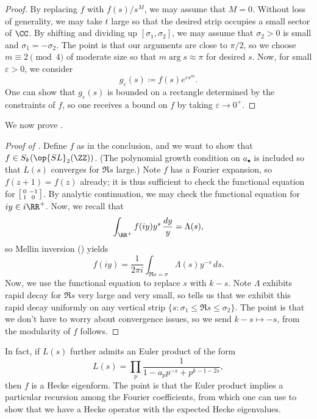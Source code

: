 \documentclass{article}
\begin{document}
\begin{proof}
	By replacing $f$ with $f(s)/s^M$, we may assume that $M=0$. Without loss of generality, we may take $t$ large so that the desired strip occupies a small sector of $\CC$. By shifting and dividing up $[\sigma_1,\sigma_2]$, we may assume that $\sigma_2>0$ is small and $\sigma_1=-\sigma_2$. The point is that our arguments are close to $\pi/2$, so we choose $m\equiv2\pmod4$ of moderate size so that $m\arg s\approx\pi$ for desired $s$. Now, for small $\varepsilon>0$, we consider
	\[g_\varepsilon(s)\coloneqq f(s)e^{\varepsilon s^m}.\]
	One can show that $g_\varepsilon(s)$ is bounded on a rectangle determined by the constraints of $f$, so one receives a bound on $f$ by taking $\varepsilon\to0^+$.
\end{proof}
We now prove .
\begin{proof}[Proof of ]
	Define $f$ as in the conclusion, and we want to show that $f\in S_k(\op{SL}_2(\ZZ))$. (The polynomial growth condition on $a_\bullet$ is included so that $L(s)$ converges for $\Re s$ large.) Note $f$ has a Fourier expansion, so $f(z+1)=f(z)$ already; it is thus sufficient to check the functional equation for $\begin{bsmallmatrix}
		0 & -1 \\ 1 & 0
	\end{bsmallmatrix}$. By analytic continuation, we may check the functional equation for $iy\in i\RR^+$. Now, we recall that
	\[\int_{\RR^+}f(iy)y^s\,\frac{dy}y=\Lambda(s),\]
	so Mellin inversion () yields
	\[f(iy)=\frac1{2\pi i}\int_{\Re s=\sigma}\Lambda(s)y^{-s}\,ds.\]
	Now, we use the functional equation to replace $s$ with $k-s$. Note $\Lambda$ exhibits rapid decay for $\Re s$ very large and very small, so  tells us that we exhibit this rapid decay uniformly on any vertical strip $\{s:\sigma_1\le\Re s\le\sigma_2\}$. The point is that we don't have to worry about convergence issues, so we send $k-s\mapsto-s$, from the modularity of $f$ follows.
\end{proof}
\begin{remark}
	In fact, if $L(s)$ further admits an Euler product of the form
	\[L(s)=\prod_p\frac1{1-a_pp^{-s}+p^{k-1-2s}},\]
	then $f$ is a Hecke eigenform. The point is that the Euler product implies a particular recursion among the Fourier coefficients, from which one can use  to show that we have a Hecke operator with the expected Hecke eigenvalues.
\end{remark}
\end{document}

